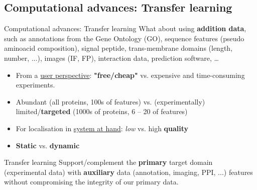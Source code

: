 

\subsection{Computational advances: Transfer learning}

\begin{frame}{Computational advances: Transfer learning}
  What about using \textbf{addition data}, such as annotations from
  the Gene Ontology (GO), sequence features (pseudo aminoacid
  composition), signal peptide, trans-membrane domains (length,
  number, ...), images (IF, FP), interaction data, prediction
  software, \ldots

  \begin{block}{}
    \begin{itemize}
    \item From a \underline{user perspective}: \textbf{"free/cheap"}
      vs. expensive and time-consuming experiments.
    \item Abundant (all proteins, 100s of features) vs. (experimentally)
      limited/\textbf{targeted} (1000s of proteins, 6 -- 20 of features)
    \item For localisation in \underline{system at hand}: \textit{low}
      vs. high \textbf{quality}
    \item \textbf{Static} vs. \textbf{dynamic}
    \end{itemize}
  \end{block}

\end{frame}

\begin{frame}{}

  \begin{block}{Transfer learning}
    Support/complement the \textbf{primary} target domain
    (experimental data) with \textbf{auxiliary} data (annotation,
    imaging, PPI, ...)  features without compromising the integrity of
    our primary data.
  \end{block}

\end{frame}


